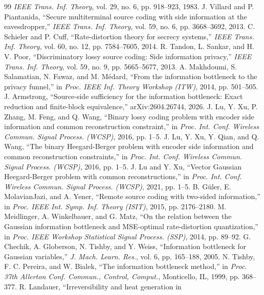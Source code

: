\documentclass[11pt,onecolumn]{IEEEtran}
\begin{document}
\begin{thebibliography}{99}
\emph{IEEE Trans. Inf. Theory}, vol. 29, no. 6, pp. 918--923, 1983.
 J. Villard and P. Piantanida, ``Secure multiterminal
source coding with side information at the eavesdropper,'' \emph{IEEE Trans.
Inf. Theory}, vol. 59, no. 6, pp. 3668--3692, 2013.
 C. Schieler and P. Cuff, ``Rate-distortion theory for
secrecy systems,'' \emph{IEEE Trans. Inf. Theory}, vol. 60, no. 12,
pp. 7584--7605, 2014.
 R. Tandon, L. Sankar, and H. V. Poor,
``Discriminatory lossy source coding: Side information privacy,''
\emph{IEEE Trans. Inf. Theory}, vol. 59, no. 9, pp. 5665--5677, 2013.
 A. Makhdoumi, S. Salamatian, N. Fawaz, and
M. M\'edard, ``From the information bottleneck to the privacy funnel,''
in \emph{Proc. IEEE Inf. Theory Workshop (ITW)}, 2014, pp. 501--505.
 J. Armstrong, ``Source-side sufficiency for the
information bottleneck: Exact reduction and finite-block equivalence,''
arXiv:2604.26744, 2026.
 J. Lu, Y. Xu, P. Zhang, M. Feng, and Q. Wang, ``Binary
lossy coding problem with encoder side information and common reconstruction
constraint,'' in \emph{Proc. Int. Conf. Wireless Commun. Signal Process.
(WCSP)}, 2016, pp. 1--5.
 J. Lu, Y. Xu, Y. Qian, and Q. Wang, ``The binary
Heegard-Berger problem with encoder side information and common reconstruction
constraints,'' in \emph{Proc. Int. Conf. Wireless Commun. Signal Process.
(WCSP)}, 2016, pp. 1--5.
 J. Lu and Y. Xu, ``Vector Gaussian Heegard-Berger problem
with common reconstructions,'' in \emph{Proc. Int. Conf. Wireless Commun. Signal
Process. (WCSP)}, 2021, pp. 1--5.
 B. G\"uler, E. MolavianJazi, and A. Yener, ``Remote source
coding with two-sided information,'' in \emph{Proc. IEEE Int. Symp. Inf. Theory
(ISIT)}, 2015, pp. 2176--2180.
 M. Meidlinger, A. Winkelbauer, and G. Matz, ``On the
relation between the Gaussian information bottleneck and MSE-optimal
rate-distortion quantization,'' in \emph{Proc. IEEE Workshop Statistical Signal
Process. (SSP)}, 2014, pp. 89--92.
 G. Chechik, A. Globerson, N. Tishby, and Y. Weiss,
``Information bottleneck for Gaussian variables,'' \emph{J. Mach. Learn.
Res.}, vol. 6, pp. 165--188, 2005.
 N. Tishby, F. C. Pereira, and W. Bialek, ``The
information bottleneck method,'' in \emph{Proc. 37th Allerton Conf. Commun.,
Control, Comput.}, Monticello, IL, 1999, pp. 368--377.
 R. Landauer, ``Irreversibility and heat generation in

\end{thebibliography}
\end{document}
